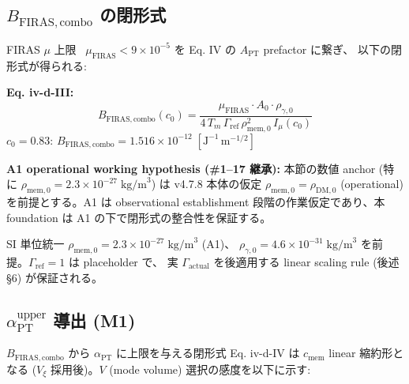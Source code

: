 \documentclass[11pt,a4paper]{ltjsarticle}
\newcommand{\cmem}{c_{\mathrm{mem}}}
\newcommand{\Vxi}{V_{\xi}}
\newcommand{\Tm}{T_{m}}
\newcommand{\aPT}{\alpha_{\mathrm{PT}}}
\newcommand{\rhomem}{\rho_{\mathrm{mem},0}}
\newcommand{\rhog}{\rho_{\gamma,0}}
\newcommand{\Imu}{I_{\mu}}
\newcommand{\APT}{A_{\mathrm{PT}}}
\newcommand{\BFIRAS}{B_{\mathrm{FIRAS,combo}}}
\newcommand{\Gammaref}{\Gamma_{\mathrm{ref}}}
\newcommand{\Gammaact}{\Gamma_{\mathrm{actual}}}
\newcommand{\muFIRAS}{\mu_{\mathrm{FIRAS}}}
\begin{document}
\subsection{$\BFIRAS$ の閉形式}
FIRAS $\mu$ 上限~\citep{Fixsen1996} $\muFIRAS < 9 \times 10^{-5}$ を Eq. IV の $\APT$ prefactor に繋ぎ、
以下の閉形式が得られる:

\begin{keybox}
\textbf{Eq. iv-d-III:}
\[
\BFIRAS(c_0) = \frac{\muFIRAS \cdot A_0 \cdot \rhog}{4\,\Tm\,\Gammaref\,\rhomem^2\,\Imu(c_0)}
\]
$c_0 = 0.83$: $\BFIRAS = 1.516 \times 10^{-12}\;[\mathrm{J}^{-1}\,\mathrm{m}^{-1/2}]$
\end{keybox}

\begin{notebox}
\textbf{A1 operational working hypothesis (\#1--17 継承):}
本節の数値 anchor (特に $\rhomem = 2.3 \times 10^{-27}\;\mathrm{kg/m}^3$) は v4.7.8 本体の仮定
$\rhomem = \rho_{\mathrm{DM},0}$ (operational) を前提とする。A1 は observational establishment
段階の作業仮定であり、本 foundation は A1 の下で閉形式の整合性を保証する。
\end{notebox}

SI 単位統一 $\rhomem = 2.3 \times 10^{-27}\;\mathrm{kg/m}^3$ (A1)、
$\rhog = 4.6 \times 10^{-31}\;\mathrm{kg/m}^3$ を前提。$\Gammaref = 1$ は placeholder で、
実 $\Gammaact$ を後適用する linear scaling rule (後述 \S 6) が保証される。

\subsection{$\aPT^{\mathrm{upper}}$ 導出 (M1)}
$\BFIRAS$ から $\aPT$ に上限を与える閉形式 Eq. iv-d-IV は $\cmem$ linear 縮約形となる
($\Vxi$ 採用後)。$V$ (mode volume) 選択の感度を以下に示す:
\end{document}
